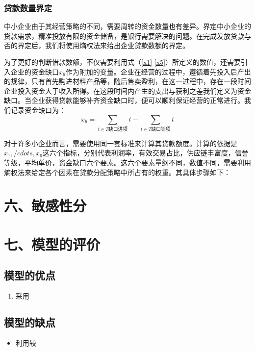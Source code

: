 \documentclass{my_paper}
\begin{document}
\subsubsection{贷款数量界定}
中小企业由于其经营策略的不同，需要周转的资金数量也有差异。界定中小企业的贷款需求，精准投放有限的资金储备，是银行需要解决的问题。在完成发放贷款与否的界定后，我们将使用熵权法来给出企业贷款数额的界定。

为了更好的判断借款数额，不仅需要利用式（\ref{x1}-\ref{x5}）所定义的数值，还需要引入企业的资金缺口$x_6$作为附加的变量。企业在经营的过程中，遵循着先投入后产出的规律，只有首先购进材料产品等，随后售卖盈利，在这一过程中，存在一段时间企业投入资金大于收入所得。在这段时间内产生的支出与获利之差我们定义为资金缺口。当企业获得贷款能够补齐资金缺口时，便可以顺利保证经营的正常进行。我们记录资金缺口为：
\begin{equation}
    x_6 =\sum\limits_{t\in T\text{缺口进项}}t-\sum\limits_{t\in T\text{缺口销项}}t
\label{x6}
\end{equation}

对于许多小企业而言，需要使用同一套标准来计算其贷款额度。计算的依据是$x_1,/cdots,x_6$这六个指标，分别代表利润率，有效交易占比，供应链丰富度，信誉等级，平均单价，资金缺口六个要素。这六个要素量纲不同，数值不同，需要利用熵权法来给定各个因素在贷款分配策略中所占有的权重。其具体步骤如下：

\section{六、敏感性分}
\section{七、模型的评价}

\subsection{模型的优点}
\begin{enumerate}
    \item 采用

\end{enumerate}

\subsection{模型的缺点}
\begin{itemize}
    \item 利用较

\end{itemize}
\end{document}
